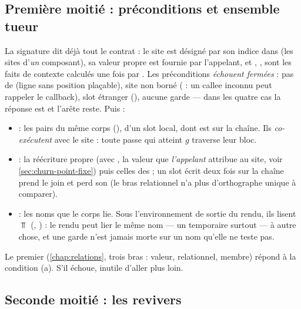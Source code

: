 \subsection{Première moitié : préconditions et ensemble tueur}


La signature dit déjà tout le contrat : le site est désigné par son indice  dans
 (les sites d'\emph{un} composant), sa valeur propre  est
fournie par l'appelant, et , ,  sont les
faits de contexte calculés une fois par . Les préconditions \emph{échouent fermées} : pas de  (ligne sans position
plaçable), site non borné ( : un callee inconnu peut rappeler le callback),
slot étranger (), aucune garde --- dans les quatre cas la
réponse est  et l'arête reste. Puis :
\begin{itemize}
  \item {} : les pairs du même corps (), d'un slot
        local, dont  est sur la chaîne. Ils \emph{co-exécutent} avec le site :
        toute passe qui atteint $g$ traverse leur bloc.
  \item {} : la réécriture propre (avec , la valeur que
        \emph{l'appelant} attribue au site, voir \cref{sec:churn-point-fixe}) puis celles des
         ; un slot écrit deux fois sur la chaîne prend le join et perd son
         (le bras relationnel n'a plus d'orthographe unique à comparer).
  \item {} : les noms que le corps lie. Sous l'environnement
        de sortie du rendu, ils lisent $\Top$ (, ) : le rendu peut
        lier le même nom --- un temporaire  surtout --- à autre chose, et une garde
        n'est jamais morte sur un nom qu'elle ne teste pas.
\end{itemize}
Le premier  (\cref{chap:relations}, trois bras : valeur, relationnel,
membre) répond à la condition (a). S'il échoue, inutile d'aller plus loin.

\subsection{Seconde moitié : les revivers}

